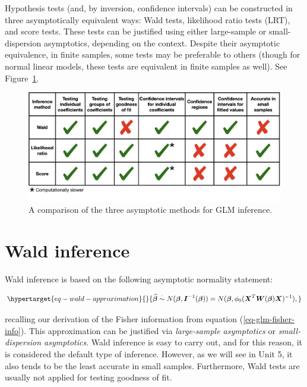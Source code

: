 \documentclass[
  11pt,
  letterpaper,
  oneside]{book}
\theoremstyle{plain}
\theoremstyle{plain}
\theoremstyle{definition}
\theoremstyle{definition}
\theoremstyle{plain}
\theoremstyle{remark}
\begin{document}
Hypothesis tests (and, by inversion, confidence intervals) can be
constructed in three asymptotically equivalent ways: Wald tests,
likelihood ratio tests (LRT), and score tests. These tests can be
justified using either large-sample or small-dispersion asymptotics,
depending on the context. Despite their asymptotic equivalence, in
finite samples, some tests may be preferable to others (though for
normal linear models, these tests are equivalent in finite samples as
well). See Figure~\ref{fig-trinity-comparison}.

\begin{figure}

{\centering \includegraphics[width=1\textwidth,height=\textheight]{figures/trinity-comparison.png}

}

\caption{\label{fig-trinity-comparison}A comparison of the three
asymptotic methods for GLM inference.}

\end{figure}

\hypertarget{sec-wald-inference}{%
\section{Wald inference}\label{sec-wald-inference}}

Wald inference is based on the following asymptotic normality statement:

\begin{equation}\protect\hypertarget{eq-wald-approximation}{}{
\boldsymbol{\widehat \beta} \overset{\cdot}{\sim} N(\boldsymbol{\beta}, \boldsymbol{I}^{-1}(\boldsymbol{\beta})) = N(\boldsymbol{\beta}, \phi_0(\boldsymbol{X}^T \boldsymbol{W}(\boldsymbol{\beta}) \boldsymbol{X})^{-1}),
}\label{eq-wald-approximation}\end{equation}

recalling our derivation of the Fisher information from equation
(\ref{eq-glm-fisher-info}). This approximation can be justified via
\emph{large-sample asymptotics} or \emph{small-dispersion asymptotics}.
Wald inference is easy to carry out, and for this reason, it is
considered the default type of inference. However, as we will see in
Unit 5, it also tends to be the least accurate in small samples.
Furthermore, Wald tests are usually not applied for testing goodness of
fit.
\end{document}
